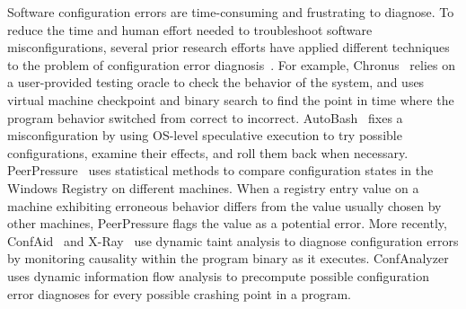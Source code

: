 Software configuration errors are time-consuming
and frustrating to diagnose. To reduce the time and human
effort needed to troubleshoot software misconfigurations,
several prior research efforts have applied different techniques
to the problem of configuration error diagnosis~\cite{Attariyan:2008:UCD, 
Whitaker:2004:CDS, Wang:2004:AMT, rangefix,
Attariyan:2010:ACT, Rabkin:2011:PPC, keller:conferr}.
For example, Chronus~\cite{Whitaker:2004:CDS} relies
on a user-provided testing oracle to check the behavior
of the system, and uses
virtual machine checkpoint and binary search to find the
point in time where the program behavior
switched from correct to incorrect. AutoBash~\cite{Su:2007:AIC}
fixes a misconfiguration by using
OS-level speculative execution to try possible
configurations, examine their effects, and roll them back when necessary.
PeerPressure~\cite{Wang:2004:AMT} 
uses statistical methods to compare
configuration states in the Windows Registry on different machines.
When a registry entry value on a machine exhibiting erroneous behavior differs
from the value usually chosen by other machines, PeerPressure
flags the value as a potential error. More recently, 
ConfAid~\cite{Attariyan:2010:ACT} and X-Ray~\cite{xray}
use dynamic taint analysis to diagnose configuration errors
by monitoring causality within the program binary as it executes.
ConfAnalyzer~\cite{Rabkin:2011:PPC} uses dynamic information flow analysis to precompute
possible configuration error diagnoses for every possible crashing point
in a program. 

